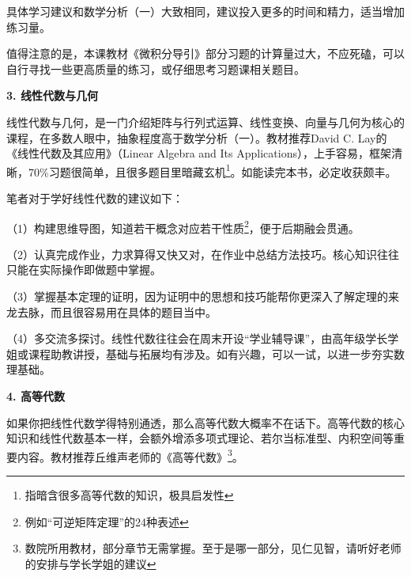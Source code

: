\vspace{10pt}

具体学习建议和数学分析（一）大致相同，建议投入更多的时间和精力，适当增加练习量。

\vspace{10pt}

值得注意的是，本课教材《微积分导引》部分习题的计算量过大，不应死磕，可以自行寻找一些更高质量的练习，或仔细思考习题课相关题目。

\vspace{10pt}

\textbf{3. 线性代数与几何} 

线性代数与几何，是一门介绍矩阵与行列式运算、线性变换、向量与几何为核心的课程，在多数人眼中，抽象程度高于数学分析（一）。教材推荐David C. Lay的《线性代数及其应用》（Linear Algebra and Its Applications），上手容易，框架清晰，70\%习题很简单，且很多题目里暗藏玄机\footnote{指暗含很多高等代数的知识，极具启发性}。如能读完本书，必定收获颇丰。

\vspace{10pt}

笔者对于学好线性代数的建议如下：

\vspace{10pt}

（1）构建思维导图，知道若干概念对应若干性质\footnote{例如“可逆矩阵定理”的24种表述}，便于后期融会贯通。

\vspace{10pt}

（2）认真完成作业，力求算得又快又对，在作业中总结方法技巧。核心知识往往只能在实际操作即做题中掌握。

\vspace{10pt}

（3）掌握基本定理的证明，因为证明中的思想和技巧能帮你更深入了解定理的来龙去脉，而且很容易用在具体的题目当中。

\vspace{10pt}

（4）多交流多探讨。线性代数往往会在周末开设“学业辅导课”，由高年级学长学姐或课程助教讲授，基础与拓展均有涉及。如有兴趣，可以一试，以进一步夯实数理基础。

\vspace{10pt}

\textbf{4. 高等代数}

如果你把线性代数学得特别通透，那么高等代数大概率不在话下。高等代数的核心知识和线性代数基本一样，会额外增添多项式理论、若尔当标准型、内积空间等重要内容。教材推荐丘维声老师的《高等代数》\footnote{数院所用教材，部分章节无需掌握。至于是哪一部分，见仁见智，请听好老师的安排与学长学姐的建议}。

